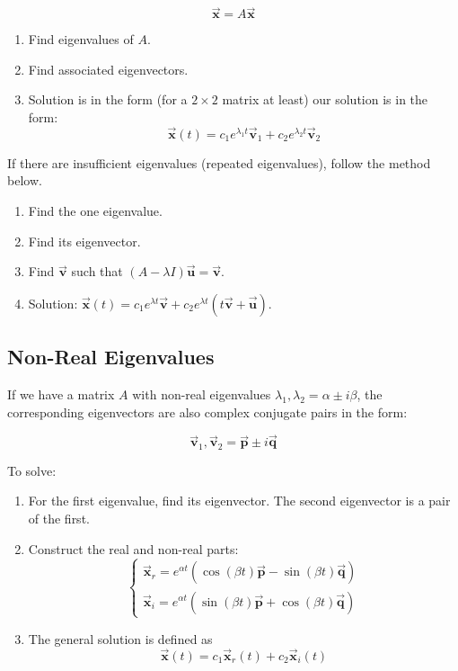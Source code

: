 \documentclass[12pt, landscape, twocolumn]{article}
\let\oldvec\vec
\renewcommand{\vec}[1]{\oldvec{\mathbf{ #1 } } }                    %
\begin{document}
        \[
            \vec{x} = A \vec{x}
        \]

        \begin{enumerate}
            \item Find eigenvalues of $A$.
            \item Find associated eigenvectors.
            \item Solution is in the form (for a $2\times 2$ matrix at least) our solution is in the form:
                \[
                    \vec{x}(t) = c_1 e^{\lambda_1 t} \vec{v}_1 + c_2 e^{\lambda_2 t} \vec{v}_2
                \]
        \end{enumerate}

    If there are insufficient eigenvalues (repeated eigenvalues), follow the method below.

        \begin{enumerate}
            \item Find the one eigenvalue.
            \item Find its eigenvector.
            \item Find $\vec{v}$ such that $(A - \lambda I) \vec{u} = \vec{v}$.
            \item Solution: $\vec{x}(t) = c_1 e^{\lambda t} \vec{v} + c_2 e^{\lambda t} (t \vec{v} + \vec{u})$.
        \end{enumerate}

    \subsection{Non-Real Eigenvalues}
    If we have a matrix $A$ with non-real eigenvalues $\lambda_1, \lambda_2 = \alpha \pm i \beta$, the corresponding eigenvectors are also complex conjugate pairs in the form:

        \[
            \vec{v}_1, \vec{v}_2 = \vec{p} \pm i \vec{q}
        \]

    To solve:

        \begin{enumerate}
            \item For the first eigenvalue, find its eigenvector. The second eigenvector is a pair of the first.
            \item Construct the real and non-real parts:
                \[
                    \begin{cases}
                        \vec{x}_r = e^{\alpha t} ( \cos(\beta t) \vec{p} - \sin(\beta t)\vec{q})\\
                        \vec{x}_i = e^{\alpha t} ( \sin(\beta t) \vec{p} + \cos(\beta t)\vec{q})
                    \end{cases}
                \]
            \item The general solution is defined as
                \[
                    \vec{x}(t) = c_1 \vec{x}_r(t) + c_2 \vec{x}_i(t)
                \]
        \end{enumerate}
\end{document}
